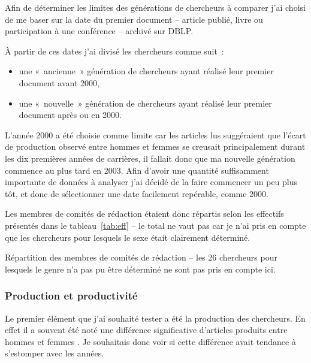 		Afin de déterminer les limites des générations de chercheurs à comparer j'ai choisi de me baser sur la date du premier document -- article publié, livre ou participation à une conférence -- archivé sur DBLP.
		
		À partir de ces dates j'ai divisé les chercheurs comme suit~:
		\begin{itemize}
			\item une «~ancienne~» génération de chercheurs ayant réalisé leur premier document avant 2000,
			\item une «~nouvelle~» génération de chercheurs ayant réalisé leur premier document après ou en 2000.
		\end{itemize}
		
		L'année 2000 a été choisie comme limite car les articles lus suggéraient que l'écart de production observé entre hommes et femmes se creusait principalement durant les dix premières années de carrières, il fallait donc que ma nouvelle génération commence au plus tard en 2003. Afin d'avoir une quantité suffisamment importante de données à analyser j'ai décidé de la faire commencer un peu plus tôt, et donc de sélectionner une date facilement repérable, comme 2000.
		
		Les  membres de comités de rédaction étaient donc répartis selon les effectifs présentés dans le tableau~\ref{tab:eff} -- le total ne vaut pas  car je n'ai pris en compte que les chercheurs pour lesquels le sexe était clairement déterminé.
		
		\begin{table}[ht]
			\centering
			\caption{Répartition des membres de comités de rédaction -- les 26 chercheurs pour lesquels le genre n'a pas pu être déterminé ne sont pas pris en compte ici.}\label{tab:eff}
			
		\end{table}
		
		
		\subsubsection{Production et productivité}			
			Le premier élément que j'ai souhaité tester a été la production des chercheurs. En effet il a souvent été noté une différence significative d'articles produits entre hommes et femmes \citep*{Nakhaie2002, Prpic2002, PenasWillett2006, bramoAngeloCaprasecca2009, BraisherGorringeElgar2006, BornmannGannonWallon2007, washburn2006, 1998}. Je souhaitais donc voir si cette différence avait tendance à s'estomper avec les années.
			

